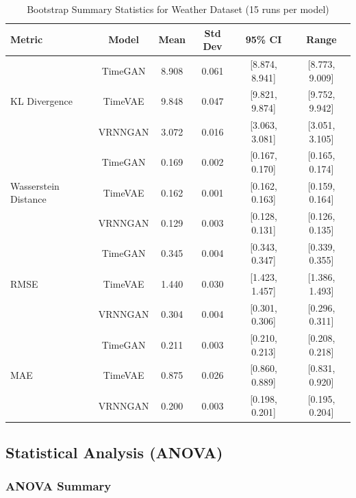 \documentclass{article}
\begin{document}
\begin{table}[H]
    \centering
    \caption{Bootstrap Summary Statistics for Weather Dataset (15 runs per model)}
    \label{tab:bootstrap_weather}
    \small
    \begin{tabular}{lccccc}
        \toprule
        \textbf{Metric} & \textbf{Model} & \textbf{Mean} & \textbf{Std Dev} & \textbf{95\% CI} & \textbf{Range} \\
        \midrule
        \multirow{3}{*}{KL Divergence} 
    & TimeGAN   & 8.908 & 0.061 & [8.874, 8.941] & [8.773, 9.009] \\
    & TimeVAE   & 9.848 & 0.047 & [9.821, 9.874] & [9.752, 9.942] \\
    & VRNNGAN   & 3.072 & 0.016 & [3.063, 3.081] & [3.051, 3.105] \\
    \midrule
    \multirow{3}{*}{Wasserstein Distance} 
    & TimeGAN   & 0.169 & 0.002 & [0.167, 0.170] & [0.165, 0.174] \\
    & TimeVAE   & 0.162 & 0.001 & [0.162, 0.163] & [0.159, 0.164] \\
    & VRNNGAN   & 0.129 & 0.003 & [0.128, 0.131] & [0.126, 0.135] \\
    \midrule
    \multirow{3}{*}{RMSE} 
    & TimeGAN   & 0.345 & 0.004 & [0.343, 0.347] & [0.339, 0.355] \\
    & TimeVAE   & 1.440 & 0.030 & [1.423, 1.457] & [1.386, 1.493] \\
    & VRNNGAN   & 0.304 & 0.004 & [0.301, 0.306] & [0.296, 0.311] \\
    \midrule
    \multirow{3}{*}{MAE} 
    & TimeGAN   & 0.211 & 0.003 & [0.210, 0.213] & [0.208, 0.218] \\
    & TimeVAE   & 0.875 & 0.026 & [0.860, 0.889] & [0.831, 0.920] \\
    & VRNNGAN   & 0.200 & 0.003 & [0.198, 0.201] & [0.195, 0.204] \\
    \bottomrule
\end{tabular}
\end{table}

\subsection{Statistical Analysis (ANOVA)}



\subsubsection{ANOVA Summary}
\end{document}
